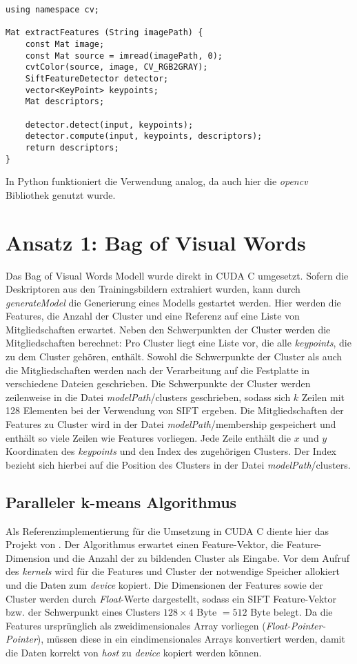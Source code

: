 \lstset{language=C}
\begin{lstlisting}
using namespace cv;

Mat extractFeatures (String imagePath) {
	const Mat image;
	const Mat source = imread(imagePath, 0);
	cvtColor(source, image, CV_RGB2GRAY);
	SiftFeatureDetector detector;
	vector<KeyPoint> keypoints;
	Mat descriptors;
	
	detector.detect(input, keypoints);
	detector.compute(input, keypoints, descriptors);
	return descriptors;
}
\end{lstlisting}

In Python funktioniert die Verwendung analog, da auch hier die \textit{opencv} Bibliothek genutzt wurde.

\section{Ansatz 1: Bag of Visual Words}

Das Bag of Visual Words Modell wurde direkt in CUDA C umgesetzt. Sofern die Deskriptoren aus den Trainingsbildern extrahiert wurden, kann durch \textit{generateModel} die Generierung eines Modells gestartet werden. Hier werden die Features, die Anzahl der Cluster und eine Referenz auf eine Liste von Mitgliedschaften erwartet. Neben den Schwerpunkten der Cluster werden die Mitgliedschaften berechnet: Pro Cluster liegt eine Liste vor, die alle \textit{keypoints}, die zu dem Cluster gehören, enthält. Sowohl die Schwerpunkte der Cluster als auch die Mitgliedschaften werden nach der Verarbeitung auf die Festplatte in verschiedene Dateien geschrieben. Die Schwerpunkte der Cluster werden zeilenweise in die Datei \textit{modelPath}/clusters geschrieben, sodass sich $k$ Zeilen mit 128 Elementen bei der Verwendung von SIFT ergeben. Die Mitgliedschaften der Features zu Cluster wird in der Datei \textit{modelPath}/membership gespeichert und enthält so viele Zeilen wie Features vorliegen. Jede Zeile enthält die $x$ und $y$ Koordinaten des \textit{keypoints} und den Index des zugehörigen Clusters. Der Index bezieht sich hierbei auf die Position des Clusters in der Datei \textit{modelPath}/clusters.

\subsection{Paralleler k-means Algorithmus}

Als Referenzimplementierung für die Umsetzung in CUDA C diente hier das Projekt von \todo{[REF]}. Der Algorithmus erwartet einen Feature-Vektor, die Feature-Dimension und die Anzahl der zu bildenden Cluster als Eingabe. Vor dem Aufruf des \textit{kernels} wird für die Features und Cluster der notwendige Speicher allokiert und die Daten zum \textit{device} kopiert. Die Dimensionen der Features sowie der Cluster werden durch \textit{Float}-Werte dargestellt, sodass ein SIFT Feature-Vektor bzw. der Schwerpunkt eines Clusters $128 \times 4$ Byte $= 512$ Byte belegt. Da die Features ursprünglich als zweidimensionales Array vorliegen (\textit{Float-Pointer-Pointer}), müssen diese in ein eindimensionales Arrays konvertiert werden, damit die Daten korrekt von \textit{host} zu \textit{device} kopiert werden können. 

